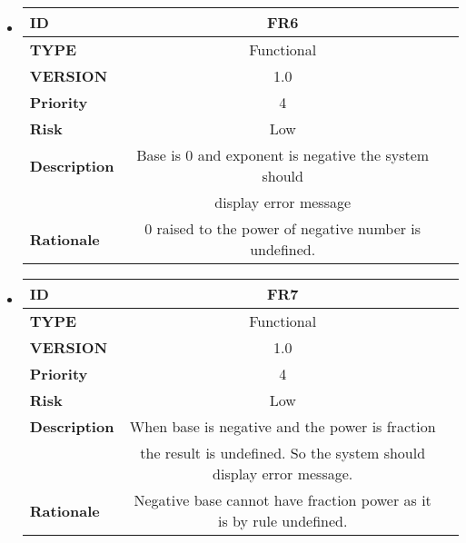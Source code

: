 \documentclass[a4paper,12pt]{article}
\begin{document}
\begin{itemize}
\begin{tabular}{|| l ||c  | c||}
	\end{tabular}
	
	
	
\item	\begin{tabular}{|| l ||c  | c||}
		\hline \hline
		\textbf{ID} & FR6  \\ 
		\hline
		\textbf{TYPE} & Functional   \\
		\hline
		\textbf{VERSION} & 1.0  \\ 
		\hline
		\textbf{Priority} & 4  \\
		\hline
		\textbf{Risk} & Low  \\ 
		\hline
		\textbf{Description} & Base is 0 and exponent is negative the system should\\& display error message\\
		\hline
		\textbf{Rationale} & 0 raised to the power of negative number is undefined.   \\
		\hline
		
	\end{tabular}
	
	\space
	
\item	\begin{tabular}{|| l ||c  | c||}
		\hline \hline
		\textbf{ID} & FR7  \\ 
		\hline
		\textbf{TYPE} & Functional   \\
		\hline
		\textbf{VERSION} & 1.0  \\ 
		\hline
		\textbf{Priority} & 4  \\
		\hline
		\textbf{Risk} & Low  \\ 
		\hline
		\textbf{Description} & When base is negative and the power is fraction\\& the result is undefined. So the system should display error message.\\
		\hline
		\textbf{Rationale} & Negative base cannot have fraction power as it is by rule undefined.\\
		\hline
		
	\end{tabular}

\end{itemize}
\end{document}
